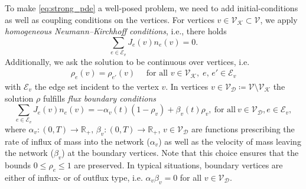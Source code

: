 To make \cref{eq:strong_pde} a well-posed problem, we need to add initial-conditions as well as coupling conditions on the vertices. 
For vertices $v \in \mathcal{V}_\mathcal{K} \subset \mathcal{V}$, we apply \emph{homogeneous Neumann--Kirchhoff conditions}, i.e., there holds
\begin{equation}
\label{eq:Kirchhoff_Neumann_condition}
    \sum_{e\in \mathcal{E}_v}J_e(v) n_e (v)=0.
\end{equation}
Additionally, we ask the solution to be continuous over vertices, i.e. 
\begin{align}
    \rho_e(v) = \rho_{e'}(v) \quad \text{ for all }v \in \mathcal{V}_\mathcal{K},\; e,\,e' \in \mathcal{E}_v
\end{align}
with $\mathcal{E}_v$ the edge set incident to the vertex $v$.
In vertices $v\in \mathcal{V}_\mathcal{D}\coloneqq\mathcal{V}\setminus \mathcal{V}_\mathcal{K}$ the solution $\rho$ fulfills \emph{flux boundary conditions}
\begin{equation}
\label{eq:Dirichlet_conditions}
    \sum_{e\in \mathcal{E}_v}J_e(v) n_e (v)=-\alpha_v(t) (1-\rho_v) + \beta_v(t) \rho_v,\ \text{for all}\ v \in \mathcal{V}_\mathcal{D}, e \in \mathcal{E}_v,
\end{equation}
where 
$\alpha_v\colon(0,T) \to \mathbb{R}_{+}, \, \beta_v \colon (0,T) \to \mathbb{R}_{+}$, ${v \in \mathcal{V}_\mathcal{D}}$
are functions prescribing the rate of influx of mass into the network ($\alpha_v$) as well as the velocity of mass leaving the network ($\beta_v$) at the boundary vertices. Note that this choice ensures that the bounds $0 \le \rho_e \le 1$ are preserved. In typical situations, boundary vertices are either of influx- or of outflux type, i.e. $\alpha_v \beta_v = 0$ for all $v \in \mathcal{V}_\mathcal{D}$.


